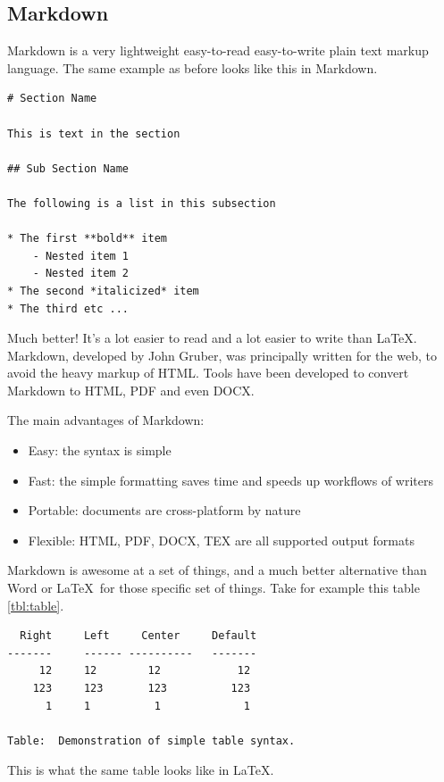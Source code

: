 \documentclass[journal,10pt,final]{IEEEtran}
\providecommand{\tightlist}{%
  \setlength{\itemsep}{0pt}\setlength{\parskip}{0pt}}
\begin{document}
\subsection{Markdown}\label{markdown}

Markdown is a very lightweight easy-to-read easy-to-write plain text
markup language. The same example as before looks like this in Markdown.

\begin{verbatim}
# Section Name

This is text in the section

## Sub Section Name

The following is a list in this subsection

* The first **bold** item
    - Nested item 1
    - Nested item 2
* The second *italicized* item
* The third etc ...
\end{verbatim}

Much better! It's a lot easier to read and a lot easier to write than
\LaTeX. Markdown, developed by John Gruber, was principally written for
the web, to avoid the heavy markup of HTML. Tools have been developed to
convert Markdown to HTML, PDF and even DOCX.

The main advantages of Markdown:

\begin{itemize}
\tightlist
\item
  Easy: the syntax is simple
\item
  Fast: the simple formatting saves time and speeds up workflows of
  writers
\item
  Portable: documents are cross-platform by nature
\item
  Flexible: HTML, PDF, DOCX, TEX are all supported output formats
\end{itemize}

Markdown is awesome at a set of things, and a much better alternative
than Word or \LaTeX~for those specific set of things. Take for example
this table \ref{tbl:table}.

\begin{verbatim}
  Right     Left     Center     Default
-------     ------ ----------   -------
     12     12        12            12
    123     123       123          123
      1     1          1             1

Table:  Demonstration of simple table syntax.
\end{verbatim}

This is what the same table looks like in \LaTeX.
\end{document}
